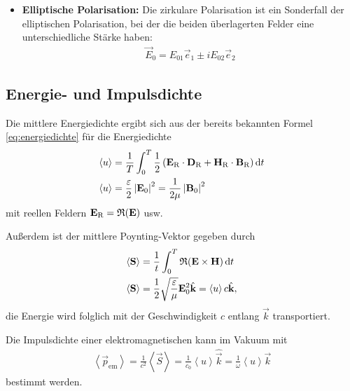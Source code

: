 \begin{itemize}
    \item \textbf{Elliptische Polarisation:} Die zirkulare Polarisation ist ein Sonderfall der elliptischen Polarisation, bei der die beiden überlagerten Felder eine unterschiedliche Stärke haben:
          \begin{align*}
              \vec E_0 = E_{01}\vec e_1 \pm i E_{02}\vec e_2
          \end{align*}

\end{itemize}




\subsection{Energie- und Impulsdichte}

Die mittlere Energiedichte ergibt sich aus der bereits bekannten Formel \eqref{eq:energiedichte} für die Energiedichte
\begin{align}
    \left\langle u\right\rangle & = \frac{1}{T} \int_0^T \frac{1}{2}\left(\mathbf{E}_\mathrm{R}\cdot \mathbf{D}_\mathrm{R}+\mathbf{H}_\mathrm{R}\cdot\mathbf{B}_\mathrm{R}\right)\mathop{}\!\mathrm{d} t \nonumber \\
    \label{eq:mittlere_energiedichte}
    \left\langle u\right\rangle & = \frac{\varepsilon}{2}\left|\mathbf{E}_0\right|^2 = \frac{1}{2\mu}\left|\mathbf{B}_0\right|^2
\end{align}
mit reellen Feldern $\mathbf{E}_\mathrm{R}=\operatorname{\mathfrak{R}}(\mathbf{E})$ usw.

Außerdem ist der mittlere Poynting-Vektor gegeben durch
\begin{align}
    \left\langle\mathbf{S}\right\rangle & = \frac{1}{t}\int_0^T\operatorname{\mathfrak{R}}(\mathbf{E}\times\mathbf{H})\mathop{}\!\mathrm{d} t \nonumber                                                   \\
    \label{eq:mittlerer_poyntingvektor}
    \left\langle\mathbf{S}\right\rangle & = \frac{1}{2} \sqrt{\frac{\varepsilon}{\mu}} \mathbf{E}_0^2 \hat{\mathbf{k}}= \left\langle u\right\rangle c \hat{\mathbf{k}},
\end{align}
die Energie wird folglich mit der Geschwindigkeit $c$ entlang $\vec k$ transportiert.

Die Impulsdichte einer elektromagnetischen kann im Vakuum mit
\begin{align}
    \label{eq:mittlere_impulsdichte}
    \left\langle\vec p_\mathrm{em}\right\rangle = \frac{1}{c^2}\left\langle\vec S\right\rangle = \frac{1}{c_0} \left\langle u\right\rangle \hat{\vec k} = \frac{1}{\omega} \left\langle u\right\rangle \vec k
\end{align}
bestimmt werden.

